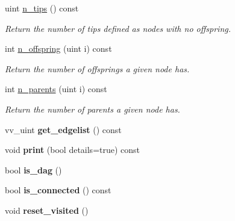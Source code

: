 \begin{DoxyCompactItemize}
\mbox{\label{classTree_a024c90c0554251bcd74c63eb3ddf0e4f}} 
uint \hyperlink{classTree_a024c90c0554251bcd74c63eb3ddf0e4f}{n\+\_\+tips} () const
\begin{DoxyCompactList}\small\item\em Return the number of tips defined as nodes with no offspring. \end{DoxyCompactList}\item 
\mbox{\label{classTree_a5466973735b473cd476777ef91b04688}} 
int \hyperlink{classTree_a5466973735b473cd476777ef91b04688}{n\+\_\+offspring} (uint i) const
\begin{DoxyCompactList}\small\item\em Return the number of offsprings a given node has. \end{DoxyCompactList}\item 
\mbox{\label{classTree_a374a4d88df374186717de41f035416ca}} 
int \hyperlink{classTree_a374a4d88df374186717de41f035416ca}{n\+\_\+parents} (uint i) const
\begin{DoxyCompactList}\small\item\em Return the number of parents a given node has. \end{DoxyCompactList}\item 
\mbox{\label{classTree_affd2187b4923fe8a6f546c5ffc2e512e}} 
vv\+\_\+uint {\bfseries get\+\_\+edgelist} () const
\item 
\mbox{\label{classTree_ac33eb096654afd2af8db760c5c87a0b5}} 
void {\bfseries print} (bool details=true) const
\item 
\mbox{\label{classTree_af72220d2b88958648bf1ecc3fb9c9de1}} 
bool {\bfseries is\+\_\+dag} ()
\item 
\mbox{\label{classTree_a45ae21eb8e2b68c38826e0e5b23ea28a}} 
bool {\bfseries is\+\_\+connected} () const
\item 
\mbox{\label{classTree_a86e267ee4663506ff62a0fb4ca277351}} 
void {\bfseries reset\+\_\+visited} ()
\item 
\mbox{\label{classTree_a59bf8f7afc1153363e9718fd28f41b27}} 

\end{DoxyCompactItemize}
